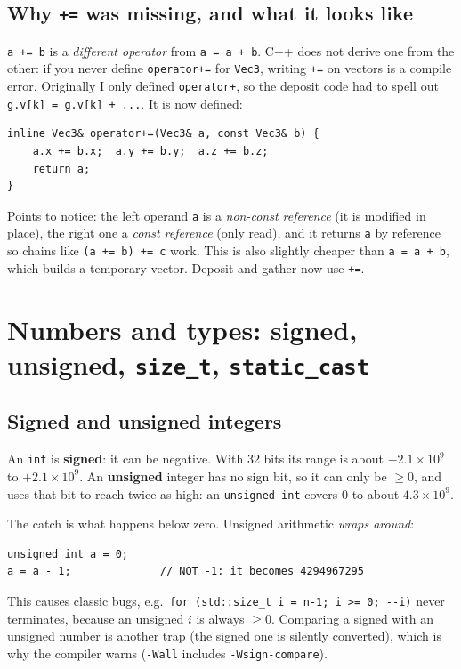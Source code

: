 \documentclass[11pt,a4paper]{article}
\begin{document}
\subsection{Why \texttt{+=} was missing, and what it looks like}
\lstinline|a += b| is a \emph{different operator} from \lstinline|a = a + b|. C++ does not derive one from
the other: if you never define \texttt{operator+=} for \texttt{Vec3}, writing \texttt{+=} on vectors is a
compile error. Originally I only defined \texttt{operator+}, so the deposit code had to spell out
\lstinline|g.v[k] = g.v[k] + ...|. It is now defined:
\begin{lstlisting}
inline Vec3& operator+=(Vec3& a, const Vec3& b) {
    a.x += b.x;  a.y += b.y;  a.z += b.z;
    return a;
}
\end{lstlisting}
Points to notice: the left operand \texttt{a} is a \emph{non-const reference} (it is modified in place),
the right one a \emph{const reference} (only read), and it returns \texttt{a} by reference so chains like
\lstinline|(a += b) += c| work. This is also slightly cheaper than \texttt{a = a + b}, which builds a
temporary vector. Deposit and gather now use \texttt{+=}.

\section{Numbers and types: signed, unsigned, \texttt{size\_t}, \texttt{static\_cast}}

\subsection{Signed and unsigned integers}
An \lstinline|int| is \textbf{signed}: it can be negative. With 32 bits its range is about
$-2.1\times10^9$ to $+2.1\times10^9$. An \textbf{unsigned} integer has no sign bit, so it can only be
$\ge0$, and uses that bit to reach twice as high: an \lstinline|unsigned int| covers $0$ to about
$4.3\times10^9$.

The catch is what happens below zero. Unsigned arithmetic \emph{wraps around}:
\begin{lstlisting}
unsigned int a = 0;
a = a - 1;              // NOT -1: it becomes 4294967295
\end{lstlisting}
This causes classic bugs, e.g.\ \lstinline|for (std::size_t i = n-1; i >= 0; --i)| never terminates,
because an unsigned $i$ is always $\ge0$. Comparing a signed with an unsigned number is another trap
(the signed one is silently converted), which is why the compiler warns (\texttt{-Wall} includes
\texttt{-Wsign-compare}).
\end{document}
